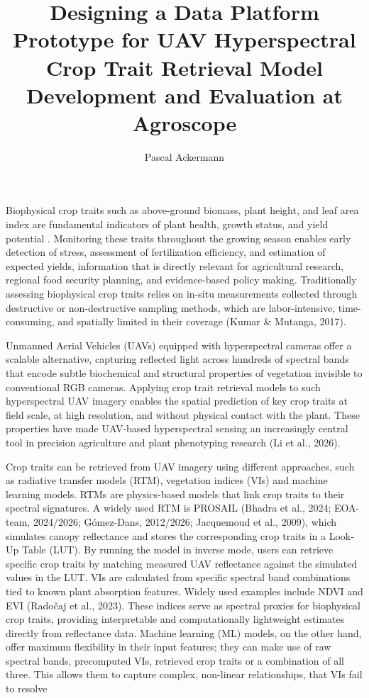 \documentclass[stu,12pt,floatsintext]{apa7}
\title{Designing a Data Platform Prototype for UAV Hyperspectral Crop Trait Retrieval Model Development and Evaluation at Agroscope}
\author{Pascal Ackermann}
\begin{document}
\maketitle %

Biophysical crop traits such as above-ground biomass, plant height, and leaf area index are fundamental indicators of plant health, growth status, and yield potential . Monitoring these traits throughout the growing season enables early detection of stress, assessment of fertilization efficiency, and estimation of expected yields, information that is directly relevant for agricultural research, regional food security planning, and evidence-based policy making. Traditionally assessing biophysical crop traits relies on in-situ measurements collected through destructive or non-destructive sampling methods, which are labor-intensive, time-consuming, and spatially limited in their coverage (Kumar \& Mutanga, 2017).

Unmanned Aerial Vehicles (UAVs) equipped with hyperspectral cameras offer a scalable alternative, capturing reflected light across hundreds of spectral bands that encode subtle biochemical and structural properties of vegetation invisible to conventional RGB cameras. Applying crop trait retrieval models to such hyperspectral UAV imagery enables the spatial prediction of key crop traits at field scale, at high resolution, and without physical contact with the plant. These properties have made UAV-based hyperspectral sensing an increasingly central tool in precision agriculture and plant phenotyping research (Li et al., 2026).

Crop traits can be retrieved from UAV imagery using different approaches, such as radiative transfer models (RTM), vegetation indices (VIs) and machine learning models.
RTMs are physics-based models that link crop traits to their spectral signatures. A widely used RTM is PROSAIL (Bhadra et al., 2024; EOA-team, 2024/2026; Gómez-Dans, 2012/2026; Jacquemoud et al., 2009), which simulates canopy reflectance and stores the corresponding crop traits in a Look-Up Table (LUT). By running the model in inverse mode, users can retrieve specific crop traits by matching measured UAV reflectance against the simulated values in the LUT. VIs are calculated from specific spectral band combinations tied to known plant absorption features. Widely used examples include NDVI and  EVI (Radočaj et al., 2023). These indices serve as spectral proxies for biophysical crop traits, providing interpretable and computationally lightweight estimates directly from reflectance data. Machine learning (ML) models, on the other hand, offer maximum flexibility in their input features; they can make use of raw spectral bands, precomputed VIs, retrieved crop traits  or a combination of all three. This allows them to capture complex, non-linear relationships, that VIs fail to resolve 
\end{document}
